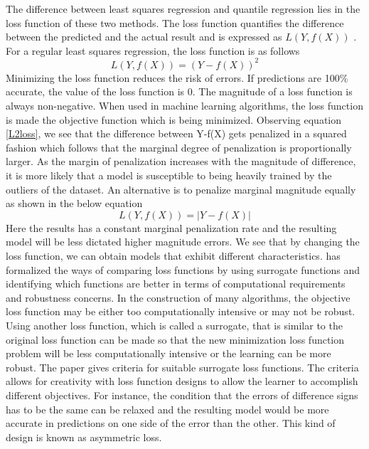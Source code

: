 The difference between least squares regression and quantile regression lies in the loss function of these two methods. The loss function quantifies the difference between the predicted and the actual result and is expressed as $L(Y,f(X))$ \citep{Hastie01}. For a regular least squares regression, the loss function is as follows
\begin{equation} \label{L2loss}
	L(Y,f(X))=(Y-f(X))^2
\end{equation}
Minimizing the loss function reduces the risk of errors. If predictions are 100\% accurate, the value of the loss function is 0. The magnitude of a loss function is always non-negative. When used in machine learning algorithms, the loss function is made the objective function which is being minimized. Observing equation \ref{L2loss}, we see that the difference between Y-f(X) gets penalized in a squared fashion which follows that the marginal degree of penalization is proportionally larger. As the margin of penalization increases with the magnitude of difference, it is more likely that a model is susceptible to being heavily trained by the outliers of the dataset. An alternative is to penalize marginal magnitude equally as shown in the below equation
\begin{equation}\label{L1loss}
	L(Y,f(X))=|Y-f(X)|
\end{equation}
Here the results has a constant marginal penalization rate and the resulting model will be less dictated higher magnitude errors. We see that by changing the loss function, we can obtain models that exhibit different characteristics. \citet{Steinwart07} has formalized the ways of comparing loss functions by using surrogate functions and identifying which functions are better in terms of computational requirements and robustness concerns. In the construction of many algorithms, the objective loss function may be either too computationally intensive or may not be robust. Using another loss function, which is called a surrogate, that is similar to the original loss function can be made so that the new minimization loss function problem will be less computationally intensive or the learning can be more robust. The paper gives criteria for suitable surrogate loss functions. The criteria allows for creativity with loss function designs to allow the learner to accomplish different objectives. For instance, the condition that the errors of difference signs has to be the same can be relaxed and the resulting model would be more accurate in predictions on one side of the error than the other. This kind of design is known as asymmetric loss. 

